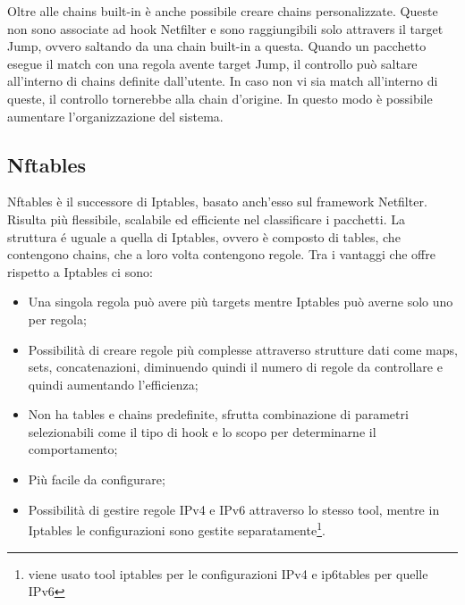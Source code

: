 Oltre alle chains built-in è anche possibile creare chains personalizzate. Queste non sono associate ad   hook Netfilter e sono raggiungibili solo attravers il target Jump, ovvero saltando da una chain built-in a questa. Quando un pacchetto esegue il match con una regola avente target Jump, il controllo può saltare all'interno di chains definite dall'utente. In caso  non vi sia match all'interno di queste, il controllo tornerebbe alla chain d'origine. In questo modo è possibile aumentare l'organizzazione del sistema. 

\subsection{Nftables}
\label{nftables}
Nftables \cite{nftables} è il successore di Iptables, basato anch'esso sul framework Netfilter. Risulta più flessibile, scalabile ed efficiente nel classificare i pacchetti.
La struttura é uguale a quella di Iptables, ovvero è composto di tables, che contengono chains, che a loro volta contengono regole.
Tra i vantaggi che offre rispetto a Iptables ci sono:
\begin{itemize}
    \item Una singola regola può avere più targets mentre Iptables può averne solo uno per regola;
    \item Possibilità di creare regole più complesse attraverso strutture dati come maps, sets, concatenazioni, diminuendo quindi il numero di regole da controllare e quindi aumentando l'efficienza;
    \item Non ha tables e chains predefinite, sfrutta combinazione di parametri selezionabili come il tipo di hook e lo scopo per determinarne il comportamento;
    \item Più facile da configurare;
    \item Possibilità di gestire regole IPv4 e IPv6   attraverso lo stesso tool, mentre in Iptables le configurazioni sono gestite separatamente\footnote{viene usato  tool iptables per le configurazioni IPv4 e ip6tables per quelle IPv6}.
\end{itemize}

